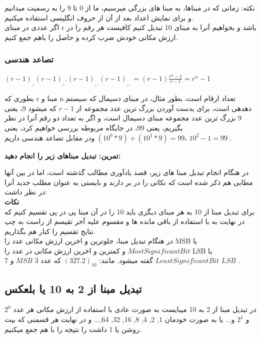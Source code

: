 \documentclass[pt, a5paper]{article}
\begin{document}
 نکته: زمانی که در مبناها، به مبنا های بزرگی میرسیم، ما از 0 تا 9 را به رسمیت میدانیم و برای نمایش اعداد بعد از آن از حروف انگلیسی استفاده میکنیم.\\

اگر عددی در مبنای r باشد و بخواهیم آنرا به مبنای 10 تبدیل کنیم کافیست هر رقم را در ارزش مکانی خودش ضرب کرده و حاصل را باهم جمع کنیم.\newline


\subsubsection{تصاعد هندسی}
$(r - 1)_{_{_{r^{1}}}}(r - 1)_{_{_{r^{0}}}}.(r - 1)_{_{_{r^{-1}}}}(r - 1)_{_{_{r^{-m}}}} = (r - 1)\frac{r^{n}-1}{r-1} = r^{n}-1$\newline

بطوری که r مبنا و n تعداد ارقام است، بطور مثال، در مبنای دسیمال که سیستم دهدهی است، برای بدست آوردن بزرگ ترین عدد مجموعه از
$r - 1$
که میشود 9، یعنی 9 بزرگ ترین عدد مجموعه مبنای دسیمال است، و اگر به تعداد دو رقم آنرا در نظر بگيريم، يعنی 99، در جایگاه مربوطه بررسی خواهیم کرد، یعنی
$(10^{0} * 9) + (10^{1} * 9) = 99$
ودر مقابل تصاعد هندسی داریم،
$10^{2} - 1 = 99 $
.

\textbf{تمرین: تبدیل مبناهای زیر را انجام دهید:}
\newline

در هنگام انجام تبدیل مبنا های زیر، قصد یادآوری مطالب گذشته است، اما در بین آنها مطابی هم ذکر شده است که نکاتی را در بر دارند و بایستی به عنوان مطلب جدید آنرا در نظر داشت:\\

\textbf{نکات}\\

برای تبدیل مبنا از 10 به هر مبنای دیگری باید 10 را در آن مبنا پی در پی تقسیم کنیم که در نهایت به با استفاده از باقی مانده ها و مقسوم علیه آخر تقیسم از راست به چپ نتایج تقسیم را کنار هم بگذاریم.\\

در هنگام تبدیل مبنا، جلوترین و اخرین ارزش مکانی عدد را MSB یا
$ Most  Significant Bit$
و کمترین و اخرین ارزش مکانی در عدد را LSB یا
$Least Significant Bit$
 گفته میشود. مانند: $(327.2)_{10}$ که عدد 3 $MSB$ و 7 
$ LSB$
 .\newline
 

\subsection{تبدیل مبنا از 2 به 10 یا بلعکس}
در تبدیل مبنا از 2 به 10 میبایست به صورت عادی با استفاده از ارزش مکانی هر عدد
$2^{0}$
و
$2^{1}$
و...
یا به صورت خودمان
1, 2, 4, 8, 16, 32, 64,...
و در نهایت هر قسمتی که بیت روشن یا 1 داشت را نتیجه را با هم جمع میکنیم.\\
\end{document}

